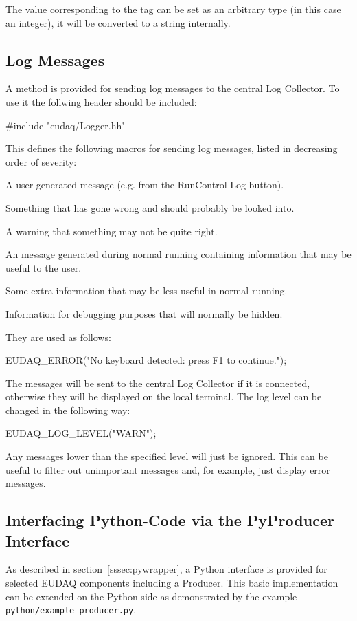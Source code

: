 The value corresponding to the tag can be set as an arbitrary type (in this case an integer),
it will be converted to a string internally.

\subsection{Log Messages}
A method is provided for sending log messages to the central Log Collector.
To use it the follwing header should be included:
\begin{listing}
#include "eudaq/Logger.hh"
\end{listing}

This defines the following macros for sending log messages,
listed in decreasing order of severity:
\begin{description}

A user-generated message (e.g. from the RunControl Log button).

Something that has gone wrong and should probably be looked into.

A warning that something may not be quite right.

An message generated during normal running containing information that may be useful to the user.

Some extra information that may be less useful in normal running.

Information for debugging purposes that will normally be hidden.

\end{description}

They are used as follows:
\begin{listing}
EUDAQ_ERROR("No keyboard detected: press F1 to continue.");
\end{listing}

The messages will be sent to the central Log Collector if it is connected,
otherwise they will be displayed on the local terminal.
The log level can be changed in the following way:
\begin{listing}
EUDAQ_LOG_LEVEL("WARN");
\end{listing}

Any messages lower than the specified level will just be ignored.
This can be useful to filter out unimportant messages and, for example, just display error messages.


\subsection{Interfacing Python-Code via the PyProducer Interface}
As described in section~\ref{sssec:pywrapper}, a Python interface is
provided for selected EUDAQ components including a Producer. This
basic implementation can be extended on the Python-side as
demonstrated by the example \texttt{python/example-producer.py}.